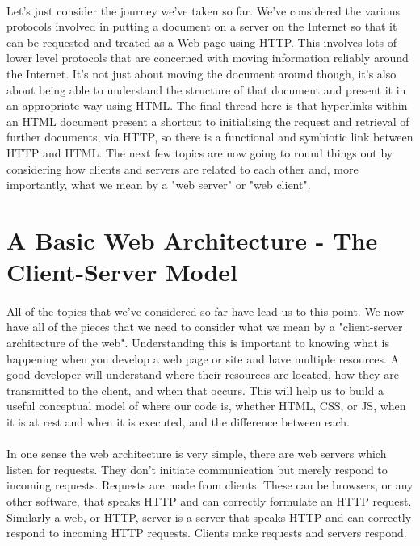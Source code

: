 \paragraph{} Let's just consider the journey we've taken so far. We've considered the various protocols involved in putting a document on a server on the Internet so that it can be requested and treated as a Web page using HTTP. This involves lots of lower level protocols that are concerned with moving information reliably around the Internet. It's not just about moving the document around though, it's also about being able to understand the structure of that document and present it in an appropriate way using HTML. The final thread here is that hyperlinks within an HTML document present a shortcut to initialising the request and retrieval of further documents, via HTTP, so there is a functional and symbiotic link between HTTP and HTML. The next few topics are now going to round things out by considering how clients and servers are related to each other and, more importantly, what we mean by a "web server" or "web client".

\section{A Basic Web Architecture - The Client-Server Model}

\paragraph{} All of the topics that we've considered so far have lead us to this point. We now have all of the pieces  that we need to consider what we mean by a "client-server architecture of the web". Understanding this is important to knowing what is happening when you develop a web page or site and have multiple resources. A good developer will understand where their resources are located, how they are transmitted to the client, and when that occurs. This will help us to build a useful conceptual model of where our code is, whether HTML, CSS, or JS, when it is at rest and when it is executed, and the difference between each.
\paragraph{} In one sense the web architecture is very simple, there are web servers which listen for requests. They don't initiate communication but merely respond to incoming requests. Requests are made from clients. These can be browsers, or any other software, that speaks HTTP and can correctly formulate an HTTP request. Similarly a web, or HTTP, server is a server that speaks HTTP and can correctly respond to incoming HTTP requests. Clients make requests and servers respond.

